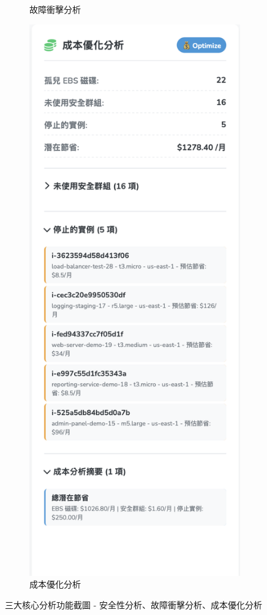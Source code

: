 \documentclass[11pt,a4paper]{ctexart}
\begin{document}
\begin{figure}[H]
\begin{subfigure}[b]{0.32\textwidth}
\caption{故障衝擊分析}
\label{fig:failure}
\end{subfigure}
\hfill
\begin{subfigure}[b]{0.32\textwidth}
\centering
\includegraphics[width=\textwidth]{成本優化分析.png}
\caption{成本優化分析}
\label{fig:cost}
\end{subfigure}
\caption{三大核心分析功能截圖 - 安全性分析、故障衝擊分析、成本優化分析}
\label{fig:analysis_screenshots}
\end{figure}
\end{document}
